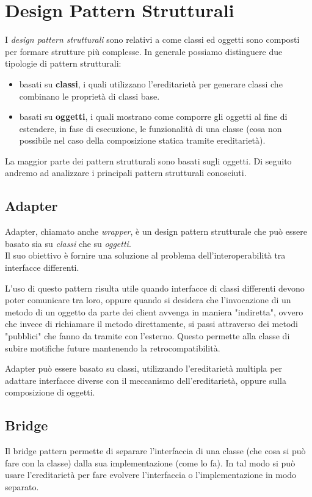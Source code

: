 \section{Design Pattern Strutturali}
I \textit{design pattern strutturali} sono relativi a come classi ed oggetti sono composti per formare strutture più complesse. In generale possiamo distinguere due tipologie di pattern strutturali:
\begin{itemize}
\item basati su \textbf{classi}, i quali utilizzano l'ereditarietà per generare classi che combinano le proprietà di classi base.
\item basati su \textbf{oggetti}, i quali mostrano come comporre gli oggetti al fine di estendere, in fase di esecuzione, le funzionalità di una classe (cosa non possibile nel caso della composizione statica tramite ereditarietà).
\end{itemize}
La maggior parte dei pattern strutturali sono basati sugli oggetti.
Di seguito andremo ad analizzare i principali pattern strutturali conosciuti.
\subsection{Adapter}
Adapter, chiamato anche \textit{wrapper}, è un design pattern strutturale che può essere basato sia su \textit{classi} che su \textit{oggetti}.\\
Il suo obiettivo è fornire una soluzione al problema dell'interoperabilità tra interfacce differenti.

L'uso di questo pattern risulta utile quando interfacce di classi differenti devono poter comunicare tra loro, oppure quando si desidera che l'invocazione di un metodo di un oggetto da parte dei client avvenga in maniera "indiretta", ovvero che invece di richiamare il metodo direttamente, si passi attraverso dei metodi "pubblici" che fanno da tramite con l'esterno. Questo permette alla classe di subire motifiche future mantenendo la retrocompatibilità.

Adapter può essere basato su classi, utilizzando l'ereditarietà multipla per adattare interfacce diverse con il meccanismo dell'ereditarietà, oppure sulla composizione di oggetti.

\subsection{Bridge}
Il bridge pattern permette di separare l'interfaccia di una classe (che cosa si può fare con la classe) dalla sua implementazione (come lo fa). In tal modo si può usare l'ereditarietà per fare evolvere l'interfaccia o l'implementazione in modo separato.


